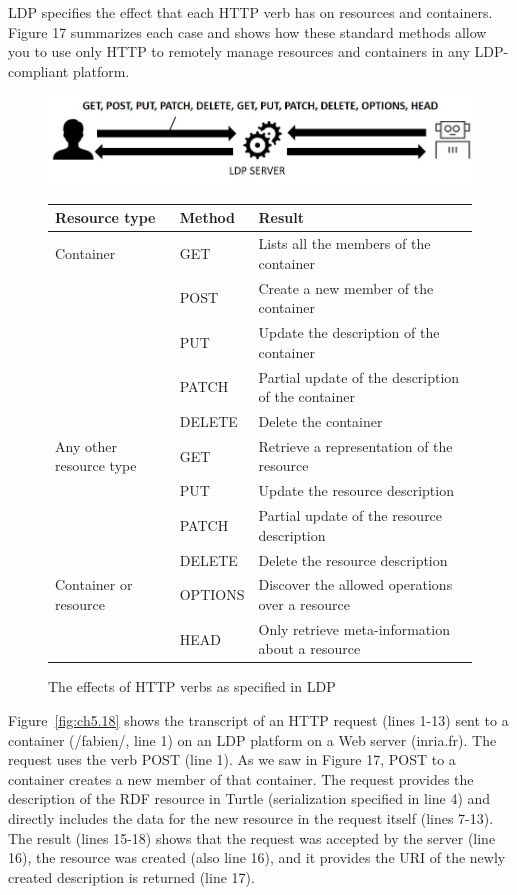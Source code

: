 LDP specifies the effect that each HTTP verb has on resources and
containers. Figure 17 summarizes each case and shows how these standard
methods allow you to use only HTTP to remotely manage resources and
containers in any LDP-compliant platform.


\begin{figure}
\includegraphics[width=5.0in]{media/figure-05-17.jpg}
\begin{tabular}{|lll|}
\hline
\textbf{Resource type} & \textbf{Method} & \textbf{Result}\tabularnewline
\hline\hline
Container & GET & Lists all the members of the container\tabularnewline
& POST & Create a new member of the container\tabularnewline
& PUT & Update the description of the container\tabularnewline
& PATCH & Partial update of the description of the
container\tabularnewline
& DELETE & Delete the container\tabularnewline
\hline
Any other resource type & GET & Retrieve a representation of the
resource\tabularnewline
& PUT & Update the resource description\tabularnewline
& PATCH & Partial update of the resource description\tabularnewline
& DELETE & Delete the resource description\tabularnewline
\hline\hline
Container or resource & OPTIONS & Discover the allowed operations over a
resource\tabularnewline
& HEAD & Only retrieve meta-information about a resource\tabularnewline
\hline
\end{tabular}
 \label{fig:ch5.17}
 \caption{The effects of HTTP verbs as specified in LDP}
\end{figure}


Figure~\ref{fig:ch5.18} shows the transcript of an HTTP request (lines 1-13) sent to a
container (/fabien/, line 1) on an LDP platform on a Web server
(inria.fr). The request uses the verb POST (line 1). As we saw in Figure
17, POST to a container creates a new member of that container. The
request provides the description of the RDF resource in Turtle
(serialization specified in line 4) and directly includes the data for
the new resource in the request itself (lines 7-13). The result (lines
15-18) shows that the request was accepted by the server (line 16), the
resource was created (also line 16), and it provides the URI of the
newly created description is returned (line 17).

